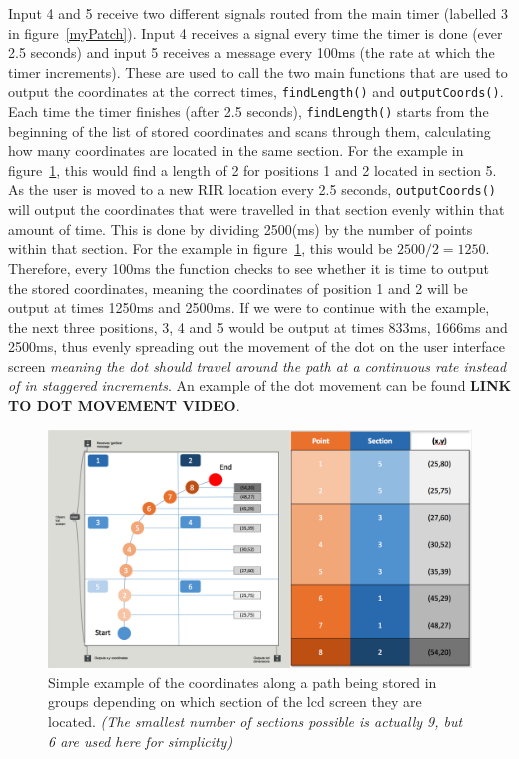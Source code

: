 \documentclass[../../main.tex]{subfiles}
\begin{document}
			Input 4 and 5 receive two different signals routed from the main timer (labelled 3 in figure~\ref{myPatch}). Input 4 receives a signal every time the timer is done (ever 2.5 seconds) and input 5 receives a message every 100ms (the rate at which the timer increments). These are used to call the two main functions that are used to output the coordinates at the correct times, \texttt{findLength()} and \texttt{outputCoords()}. Each time the timer finishes (after 2.5 seconds), \texttt{findLength()} starts from the beginning of the list of stored coordinates and scans through them, calculating how many coordinates are located in the same section. For the example in figure~\ref{locationsExample}, this would find a length of 2 for positions 1 and 2 located in section 5. As the user is moved to a new \ac{RIR} location every 2.5 seconds, \texttt{outputCoords()} will output the coordinates that were travelled in that section evenly within that amount of time. This is done by dividing 2500(ms) by the number of points within that section. For the example in figure~\ref{locationsExample}, this would be $2500/2 = 1250$. Therefore, every 100ms the function checks to see whether it is time to output the stored coordinates, meaning the coordinates of position 1 and 2 will be output at times 1250ms and 2500ms. If we were to continue with the example, the next three positions, 3, 4 and 5 would be output at times 833ms, 1666ms and 2500ms, thus evenly spreading out the movement of the dot on the user interface screen \textit{meaning the dot should travel around the path at a continuous rate instead of in staggered increments}. An example of the dot movement can be found \textbf{LINK TO DOT MOVEMENT VIDEO}.

			\begin{figure}[H]
				\centerline{\includegraphics[scale = 0.4]{Sections/Implementation/Max/images/Max/UserInterface/locationsExample2.png}}
				\caption{Simple example of the coordinates along a path being stored in groups depending on which section of the lcd screen they are located. \textit{(The smallest number of sections possible is actually 9, but 6 are used here for simplicity)}}
				\label{locationsExample}
			\end{figure}
\end{document}
